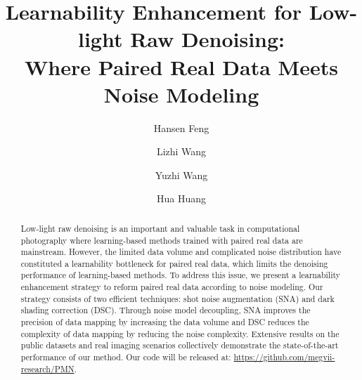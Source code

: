 \documentclass[sigconf,screen,nonacm]{acmart}
\begin{document}

\title[]{Learnability Enhancement for Low-light Raw Denoising: \\ Where Paired Real Data Meets Noise Modeling}












	\author{Hansen Feng}
	
	\author{Lizhi Wang}
	
	\author{Yuzhi Wang}
	
	\author{Hua Huang}
	

\renewcommand{\shortauthors}{}

\renewcommand{\thefootnote}{}

\begin{abstract}
    Low-light raw denoising is an important and valuable task in computational photography where learning-based methods trained with paired real data are mainstream.
    However, the limited data volume and complicated noise distribution have constituted a learnability bottleneck for paired real data, which limits the denoising performance of learning-based methods.
    To address this issue, we present a learnability enhancement strategy to reform paired real data according to noise modeling.
    Our strategy consists of two efficient techniques: shot noise augmentation (SNA) and dark shading correction (DSC).
    Through noise model decoupling, SNA improves the precision of data mapping by increasing the data volume and DSC reduces the complexity of data mapping by reducing the noise complexity.
    Extensive results on the public datasets and real imaging scenarios collectively demonstrate the state-of-the-art performance of our method. Our code will be released at: \url{https://github.com/megvii-research/PMN}.


\end{abstract}
\end{document}
